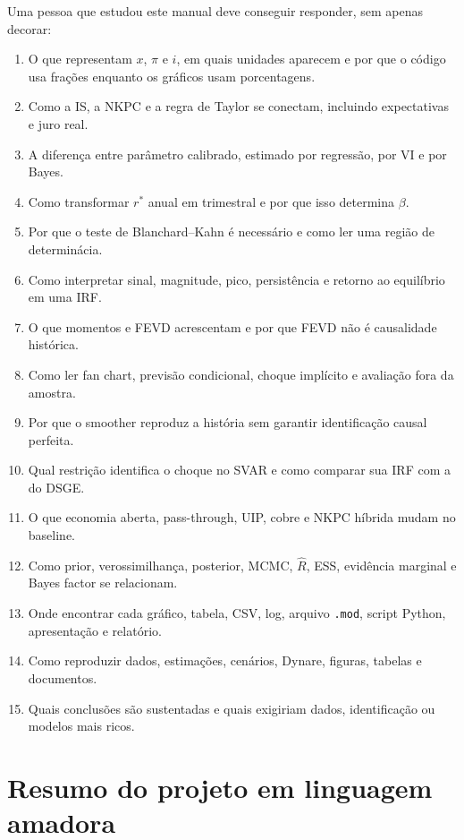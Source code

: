 \documentclass[11pt,a4paper]{article}
\begin{document}
Uma pessoa que estudou este manual deve conseguir responder, sem apenas decorar:
\begin{enumerate}
  \item O que representam \(x\), \(\pi\) e \(i\), em quais unidades aparecem e por que o código usa
        frações enquanto os gráficos usam porcentagens.
  \item Como a IS, a NKPC e a regra de Taylor se conectam, incluindo expectativas e juro real.
  \item A diferença entre parâmetro calibrado, estimado por regressão, por VI e por Bayes.
  \item Como transformar \(r^\ast\) anual em trimestral e por que isso determina \(\beta\).
  \item Por que o teste de Blanchard--Kahn é necessário e como ler uma região de determinácia.
  \item Como interpretar sinal, magnitude, pico, persistência e retorno ao equilíbrio em uma IRF.
  \item O que momentos e FEVD acrescentam e por que FEVD não é causalidade histórica.
  \item Como ler fan chart, previsão condicional, choque implícito e avaliação fora da amostra.
  \item Por que o smoother reproduz a história sem garantir identificação causal perfeita.
  \item Qual restrição identifica o choque no SVAR e como comparar sua IRF com a do DSGE.
  \item O que economia aberta, pass-through, UIP, cobre e NKPC híbrida mudam no baseline.
  \item Como prior, verossimilhança, posterior, MCMC, \(\widehat R\), ESS, evidência marginal e
        Bayes factor se relacionam.
  \item Onde encontrar cada gráfico, tabela, CSV, log, arquivo \texttt{.mod}, script Python,
        apresentação e relatório.
  \item Como reproduzir dados, estimações, cenários, Dynare, figuras, tabelas e documentos.
  \item Quais conclusões são sustentadas e quais exigiriam dados, identificação ou modelos mais
        ricos.
\end{enumerate}

\section{Resumo do projeto em linguagem amadora}
\end{document}
